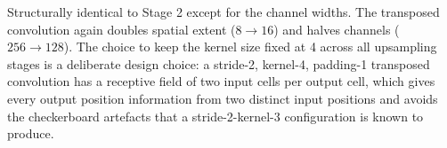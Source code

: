 
Structurally identical to Stage 2 except for the channel widths. The
transposed convolution again doubles spatial extent ($8 \to 16$) and
halves channels ($256 \to 128$). The choice to keep the kernel size
fixed at 4 across all upsampling stages is a deliberate design choice: a
stride-2, kernel-4, padding-1 transposed convolution has a receptive
field of two input cells per output cell, which gives every output
position information from two distinct input positions and avoids the
checkerboard artefacts that a stride-2-kernel-3 configuration is known
to produce.
